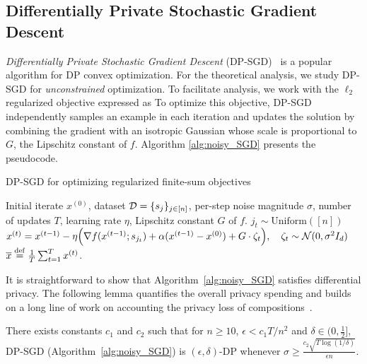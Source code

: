 \subsection{Differentially Private Stochastic Gradient Descent}
\emph{Differentially Private Stochastic Gradient Descent} (DP-SGD)~\cite{abadi2016deep,song2013stochastic} is a popular algorithm for DP convex optimization.
For the theoretical analysis, we study DP-SGD for \emph{unconstrained} optimization. 
To facilitate analysis, we work with the $\ell_{2}$ regularized objective expressed as 
To optimize this objective, DP-SGD independently samples an example in each iteration and updates the solution by combining the gradient with an isotropic Gaussian whose scale is proportional to $G$, the Lipschitz constant of $f$. 
Algorithm \ref{alg:noisy_SGD} presents the pseudocode.
\begin{algorithm}
\caption{DP-SGD for optimizing regularized finite-sum objectives}
\label{alg:noisy_SGD}
\begin{algorithmic}
\Require Initial iterate $x^{(0)}$, dataset $\mathcal D = \{s_j\}_{j \in [n]}$, per-step noise magnitude $\sigma$, number of updates $T$, learning rate $\eta$, Lipschitz constant $G$ of $f$.
    \State $j_t \sim \text{Uniform}([n])$
    \State $x^{(t)} = x^{(t-1)} - \eta\Big(\nabla f(x^{(t-1)};s_{j_t}) + \alpha(x^{(t-1)}-x^{(0)})+ G \cdot \zeta_t \Big), \quad \zeta_t \sim \mathcal N(0,\sigma^{2}I_d)$
\EndFor
\Return $\overline{x}\stackrel{{\mathrm{def}}}{=}\frac{1}{T}\sum_{t=1}^{T}x^{(t)}$.
\end{algorithmic}
\end{algorithm}


It is straightforward to show that Algorithm~\ref{alg:noisy_SGD} satisfies differential privacy. 
The following lemma quantifies the overall privacy spending and builds on a long line of work on accounting the privacy loss of compositions~\cite{abadi2016deep,balle2018privacy}.
\begin{lemm}
\label{lm:privacy_guarantee}
There exists constants $c_1$ and $c_2$ such that for $n\geq10$, $\epsilon< c_1 T/n^2$ and $\delta \in (0, \frac{1}{2}]$, DP-SGD (Algorithm~\ref{alg:noisy_SGD}) is $(\epsilon,\delta)$-DP whenever $\sigma \ge \frac{c_2 \sqrt{T\log(1/\delta)}}{\epsilon n}$.
\end{lemm}

